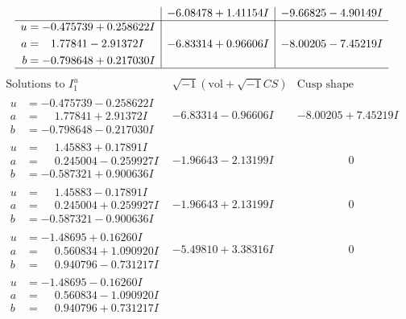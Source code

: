 \documentclass[1p]{elsarticle_modified}
\theoremstyle{definition}
\newcommand{\I}{\sqrt{-1}}
\begin{document}
$$\begin{array}{c|c|c}
 & -6.08478 + 1.41154 I & -9.66825 - 4.90149 I \\ \hline\begin{aligned}
u &= -0.475739 + 0.258622 I \\
a &= \phantom{-}1.77841 - 2.91372 I \\
b &= -0.798648 + 0.217030 I\end{aligned}
 & -6.83314 + 0.96606 I & -8.00205 - 7.45219 I\\
 \hline 
 \end{array}$$\newpage$$\begin{array}{c|c|c}  
\text{Solutions to }I^u_{1}& \I (\text{vol} + \sqrt{-1}CS) & \text{Cusp shape}\\
 \hline 
\begin{aligned}
u &= -0.475739 - 0.258622 I \\
a &= \phantom{-}1.77841 + 2.91372 I \\
b &= -0.798648 - 0.217030 I\end{aligned}
 & -6.83314 - 0.96606 I & -8.00205 + 7.45219 I \\ \hline\begin{aligned}
u &= \phantom{-}1.45883 + 0.17891 I \\
a &= \phantom{-}0.245004 - 0.259927 I \\
b &= -0.587321 + 0.900636 I\end{aligned}
 & -1.96643 - 2.13199 I & \phantom{-0.000000 } 0 \\ \hline\begin{aligned}
u &= \phantom{-}1.45883 - 0.17891 I \\
a &= \phantom{-}0.245004 + 0.259927 I \\
b &= -0.587321 - 0.900636 I\end{aligned}
 & -1.96643 + 2.13199 I & \phantom{-0.000000 } 0 \\ \hline\begin{aligned}
u &= -1.48695 + 0.16260 I \\
a &= \phantom{-}0.560834 + 1.090920 I \\
b &= \phantom{-}0.940796 - 0.731217 I\end{aligned}
 & -5.49810 + 3.38316 I & \phantom{-0.000000 } 0 \\ \hline\begin{aligned}
u &= -1.48695 - 0.16260 I \\
a &= \phantom{-}0.560834 - 1.090920 I \\
b &= \phantom{-}0.940796 + 0.731217 I\end{aligned}

\end{array}$$
\end{document}
